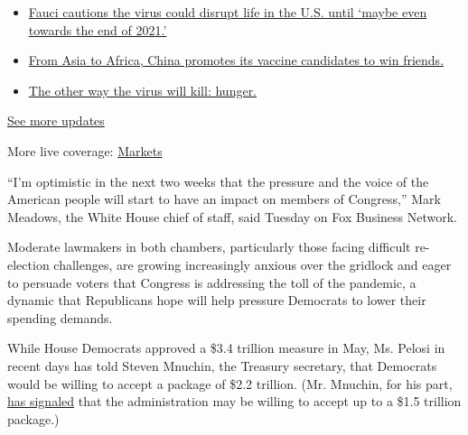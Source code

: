 \begin{itemize}
\tightlist
\item
  \href{https://www.nytimes3xbfgragh.onion/2020/09/11/world/covid-19-coronavirus.html?action=click\&pgtype=Article\&state=default\&region=MAIN_CONTENT_1\&context=storylines_live_updates\#link-dfb8a16}{Fauci
  cautions the virus could disrupt life in the U.S. until `maybe even
  towards the end of 2021.'}
\item
  \href{https://www.nytimes3xbfgragh.onion/2020/09/11/world/covid-19-coronavirus.html?action=click\&pgtype=Article\&state=default\&region=MAIN_CONTENT_1\&context=storylines_live_updates\#link-7104d154}{From
  Asia to Africa, China promotes its vaccine candidates to win friends.}
\item
  \href{https://www.nytimes3xbfgragh.onion/2020/09/11/world/covid-19-coronavirus.html?action=click\&pgtype=Article\&state=default\&region=MAIN_CONTENT_1\&context=storylines_live_updates\#link-393ad215}{The
  other way the virus will kill: hunger.}
\end{itemize}

\href{https://www.nytimes3xbfgragh.onion/2020/09/11/world/covid-19-coronavirus.html?action=click\&pgtype=Article\&state=default\&region=MAIN_CONTENT_1\&context=storylines_live_updates}{See
more updates}

More live coverage:
\href{https://www.nytimes3xbfgragh.onion/live/2020/09/11/business/stock-market-today-coronavirus?action=click\&pgtype=Article\&state=default\&region=MAIN_CONTENT_1\&context=storylines_live_updates}{Markets}

``I'm optimistic in the next two weeks that the pressure and the voice
of the American people will start to have an impact on members of
Congress,'' Mark Meadows, the White House chief of staff, said Tuesday
on Fox Business Network.

Moderate lawmakers in both chambers, particularly those facing difficult
re-election challenges, are growing increasingly anxious over the
gridlock and eager to persuade voters that Congress is addressing the
toll of the pandemic, a dynamic that Republicans hope will help pressure
Democrats to lower their spending demands.

While House Democrats approved a \$3.4 trillion measure in May, Ms.
Pelosi in recent days has told Steven Mnuchin, the Treasury secretary,
that Democrats would be willing to accept a package of \$2.2 trillion.
(Mr. Mnuchin, for his part,
\href{https://www.nytimes3xbfgragh.onion/2020/09/01/business/economy/mnuchin-coronavirus.html}{has
signaled} that the administration may be willing to accept up to a \$1.5
trillion package.)

